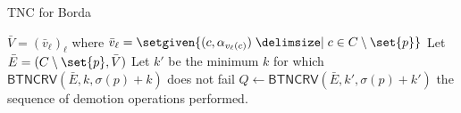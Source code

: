 \documentclass[letterpaper]{article} %
\newcommand{\SB}{\textsc{TNC}}
\newcommand{\CF}{\mathsf{BTNCRV}}
\newcommand{\heap}{\mathrm{heap}}
\newcommand{\heapify}{\mathsf{heapify}}
\begin{document}


\begin{algorithm}[tb]
\caption{\SB{} for Borda}
\label{3k-approxAlg}
$\bar{V}=( \bar{v}_{\ell})_{\ell}$ where $\bar{v}_{\ell} = \setgiven{(c, \alpha_{v_\ell(c)})\given c \in C \setminus \set{p}}$\;
Let $\bar{E} = (C \setminus \set{p}, \bar{V})$\label{line:construct}\;
Let $k'$ be the minimum $k$ for which $\CF(\bar{E}, k, \sigma(p)+k)$ does not fail\label{3k-approxAlg:t-definition}\;
$Q \gets \CF(\bar{E}, k', \sigma(p)+k')$ \label{3k-approxAlg:BeforeBribe}\;
\Return the sequence of demotion operations performed.\;
\end{algorithm}
\end{document}
